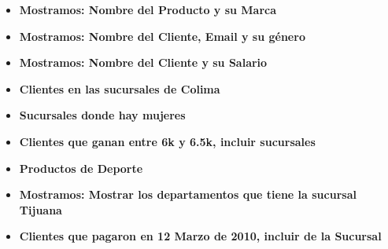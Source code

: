 \documentclass[12pt, fleqn]{article}                             %
\begin{document}
\begin{itemize}
        \item
            \textbf{Mostramos: Nombre del Producto y su Marca}
            

        \item
            \textbf{Mostramos: Nombre del Cliente, Email y su género}
            

        \item
            \textbf{Mostramos: Nombre del Cliente y su Salario}
            







        \item
            \textbf{Clientes en las sucursales de Colima}
            

        \item
            \textbf{Sucursales donde hay mujeres}
            

        \clearpage

        \item
            \textbf{Clientes que ganan entre 6k y 6.5k, incluir sucursales}
            

        \item
            \textbf{Productos de Deporte}
            

        \item
            \textbf{Mostramos: Mostrar los departamentos que tiene la sucursal Tijuana}
            

        \item
            \textbf{Clientes que pagaron en 12 Marzo de 2010, incluir de la Sucursal}
            

    \end{itemize}


    \clearpage
\end{document}
